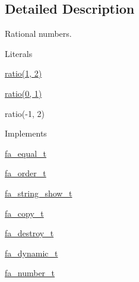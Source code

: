 \subsection{Detailed Description}
Rational numbers. \begin{DoxyParagraph}{Literals}

\begin{DoxyItemize}
\item {\ttfamily \hyperlink{util_8h_a866d3cbbee2679ec3c34f27a256445de}{ratio(1, 2)}}
\item {\ttfamily \hyperlink{util_8h_a866d3cbbee2679ec3c34f27a256445de}{ratio(0, 1)}}
\item {\ttfamily ratio(-\/1, 2)}
\end{DoxyItemize}
\end{DoxyParagraph}
\begin{DoxyParagraph}{Implements }

\begin{DoxyItemize}
\item \hyperlink{structfa__equal__t}{fa\-\_\-equal\-\_\-t}
\item \hyperlink{structfa__order__t}{fa\-\_\-order\-\_\-t}
\item \hyperlink{structfa__string__show__t}{fa\-\_\-string\-\_\-show\-\_\-t}
\item \hyperlink{structfa__copy__t}{fa\-\_\-copy\-\_\-t}
\item \hyperlink{structfa__destroy__t}{fa\-\_\-destroy\-\_\-t}
\item \hyperlink{structfa__dynamic__t}{fa\-\_\-dynamic\-\_\-t}
\item \hyperlink{structfa__number__t}{fa\-\_\-number\-\_\-t} 
\end{DoxyItemize}
\end{DoxyParagraph}


